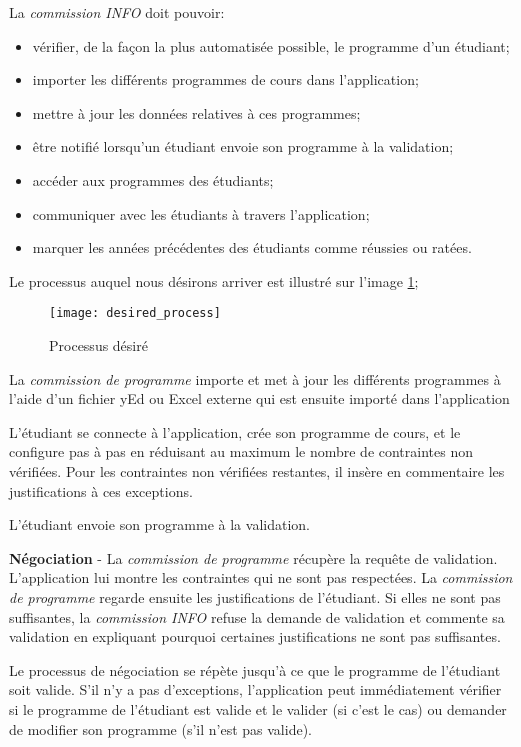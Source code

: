 La \textit{commission INFO} doit pouvoir:
\begin{itemize}
\item vérifier, de la façon la plus automatisée possible, le programme d'un étudiant;
\item importer les différents programmes de cours dans l'application;
\item mettre à jour les données relatives à ces programmes;
\item être notifié lorsqu'un étudiant envoie son programme à la validation;
\item accéder aux programmes des étudiants;
\item communiquer avec les étudiants à travers l'application;
\item marquer les années précédentes des étudiants comme réussies ou ratées.
\end{itemize}

Le processus auquel nous désirons arriver est illustré sur l'image \ref{fig:desired_process};

\begin{figure}
\centering
\caption{Processus désiré}
\label{fig:desired_process}
\texttt{[image: desired\_process]}
\end{figure}


La \textit{commission de programme} importe et met à jour les différents programmes à l'aide d'un fichier yEd ou Excel externe qui est ensuite importé dans l'application

L'étudiant se connecte à l'application, crée son programme de cours, et le configure pas à pas en réduisant au maximum le nombre de contraintes non vérifiées. Pour les contraintes non vérifiées restantes, il insère en commentaire les justifications à ces exceptions. 

L'étudiant envoie son programme à la validation. 

\textbf{Négociation} - La \textit{commission de programme} récupère la requête de validation. L'application lui montre les contraintes qui ne sont pas respectées. La \textit{commission de programme} regarde ensuite les justifications de l'étudiant. Si elles ne sont pas suffisantes, la \textit{commission INFO} refuse la demande de validation et commente sa validation en expliquant pourquoi certaines justifications ne sont pas suffisantes. 

Le processus de négociation se répète jusqu'à ce que le programme de l'étudiant soit valide. S'il n'y a pas d'exceptions, l'application peut immédiatement vérifier si le programme de l'étudiant est valide et le valider (si c'est le cas) ou demander de modifier son programme (s'il n'est pas valide).





